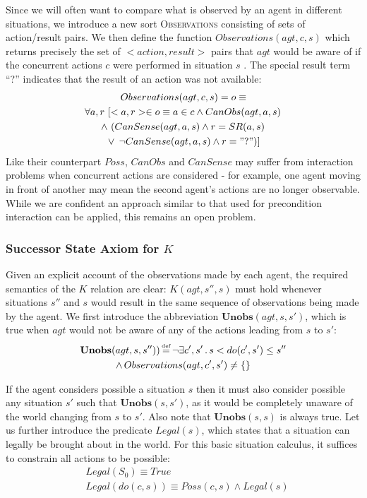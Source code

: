 \documentclass[letterpaper]{article}
\newcommand{\noun}[1]{\textsc{#1}}
\newcommand{\isdef}{\hbox{$\stackrel{\mbox{\tiny def}}{=}$}}
\begin{document}
Since we will often want to compare what is observed by an agent in
different situations, we introduce a new sort \noun{Observations}
consisting of sets of action/result pairs. We then define the function
$Observations(agt,c,s)$ which returns precisely the set of $<action,result>$
pairs that $agt$ would be aware of if the concurrent actions $c$
were performed in situation $s$ . The special result term {}``?''
indicates that the result of an action was not available:\begin{multline}
Observations(agt,c,s)=o\equiv\\
\forall a,r\,\left[<a,r>\in o\equiv a\in c\wedge CanObs(agt,a,s)\right.\\
\wedge\,\left(CanSense(agt,a,s)\wedge r=SR(a,s)\right.\\
\left.\vee\,\left.\neg CanSense(agt,a,s)\wedge r="?"\right)\right]\label{eqn:observations_orig}\end{multline}
Like their counterpart $Poss$, $CanObs$ and $CanSense$ may suffer
from interaction problems when concurrent actions are considered -
for example, one agent moving in front of another may mean the second
agent's actions are no longer observable. While we are confident an
approach similar to that used for precondition interaction can be
applied, this remains an open problem.


\subsubsection{Successor State Axiom for $K$}

Given an explicit account of the observations made by each agent,
the required semantics of the $K$ relation are clear: $K(agt,s'',s)$
must hold whenever situations $s''$ and $s$ would result in the
same sequence of observations being made by the agent. We first introduce
the abbreviation $\mathbf{Unobs}(agt,s,s')$, which is true when $agt$
would not be aware of any of the actions leading from $s$ to $s'$:
\begin{multline}
\mathbf{Unobs}(agt,s,s''))\,\isdef\,\neg\exists c',s'\,.\, s<do(c',s')\leq s''\\
\wedge\, Observations(agt,c',s')\neq\{\}\label{eqn:unobs_defn}\end{multline}

If the agent considers possible a situation $s$ then it must also
consider possible any situation $s'$ such that $\mathbf{Unobs}(s,s')$,
as it would be completely unaware of the world changing from $s$
to $s'$. Also note that $\mathbf{Unobs}(s,s)$ is always true. Let
us further introduce the predicate $Legal(s)$, which states that
a situation can legally be brought about in the world. For this basic
situation calculus, it suffices to constrain all actions to be possible:
\begin{equation}
\begin{split}
& Legal(S_{0})\equiv True\\
& Legal(do(c,s))\equiv Poss(c,s)\wedge Legal(s)\end{split}
\end{equation}
\end{document}
